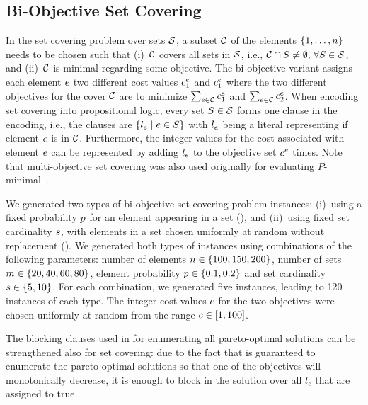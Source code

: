 \subsection{Bi-Objective Set Covering}

In the set covering problem over sets $\mathcal{S}$, a subset $\mathcal{C}$ of the elements $\{1,\dots,n\}$ needs to be chosen such that (i)~$\mathcal{C}$ covers all sets in $\mathcal{S}$, i.e., $\mathcal{C}\cap S\neq\emptyset,\,\forall S\in\mathcal{S}$, and (ii)~$\mathcal{C}$ is minimal regarding some objective.
The bi-objective variant assigns each element $e$ two different cost values $c^e_1$ and $c^e_1$ where the two different objectives for the cover $\mathcal{C}$ are to minimize $\sum_{e\in\mathcal{C}}c^e_1$ and $\sum_{e\in\mathcal{C}}c^e_2$.
When encoding set covering into propositional logic, every set $S\in\mathcal{S}$ forms one clause in the encoding, i.e., the clauses are $\{l_e \mid e\in S\}$ with $l_e$ being a literal representing if element $e$ is in $\mathcal{C}$.
Furthermore, the integer values for the cost associated with element $e$ can be represented by adding $l_e$ to the objective set $c^e$ times.
Note that multi-objective set covering was also used originally for evaluating $P$-minimal~\autocite{DBLP:conf/cp/SohBTB17}.

We generated two types of  bi-objective set covering problem instances:
(i)~using a fixed probability $p$ for an element appearing in a set (\scep{}), and (ii)~using fixed set cardinality $s$, with elements in a set chosen uniformly at random without replacement (\scsc{}).
We generated both types of instances using combinations of the following parameters:
number of elements $n\in\{100,150,200\}$, number of sets $m\in\{20,40,60,80\}$, element probability $p\in\{0.1,0.2\}$ and set cardinality $s\in\{5,10\}$.
For each combination, we generated five instances, leading to 120 instances of each type.
The integer cost values $c$ for the two objectives were chosen uniformly at random from the range $c\in[1,100]$.

The blocking clauses used in \algname{} for enumerating all pareto-optimal solutions can be strengthened also for set covering:
due to the fact that \algname{} is guaranteed to enumerate the pareto-optimal solutions so that one of the objectives will monotonically decrease, it is enough to block in \algname{} the solution over all $l_e$ that are assigned to true.

